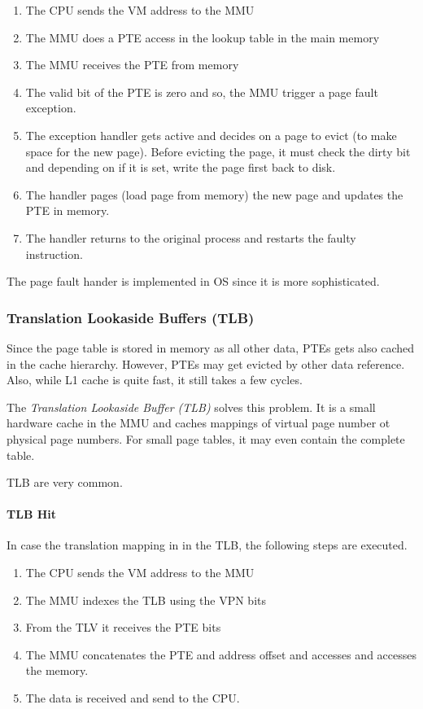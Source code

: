 \begin{enumerate}
    \item The CPU sends the VM address to the MMU
    \item The MMU does a PTE access in the lookup table in the main memory
    \item The MMU receives the PTE from memory
    \item The valid bit of the PTE is zero and so, the MMU trigger a page fault exception.
    \item The exception handler gets active and decides on a page to evict (to make space for the new page). Before evicting the page, it must check the dirty bit and depending on if it is set, write the page first back to disk.
    \item The handler pages (load page from memory) the new page and updates the PTE in memory.
    \item The handler returns to the original process and restarts the faulty instruction.
\end{enumerate}

The page fault hander is implemented in OS since it is more sophisticated.

\subsubsection{Translation Lookaside Buffers (TLB)}
Since the page table is stored in memory as all other data, PTEs gets also cached in the cache hierarchy. However, PTEs may get evicted by other data reference. Also, while L1 cache is quite fast, it still takes a few cycles. 

The \textit{Translation Lookaside Buffer (TLB)} solves this problem. It is a small hardware cache in the MMU and caches mappings of virtual page number ot physical page numbers. For small page tables, it may even contain the complete table.

TLB are very common.

\paragraph{TLB Hit}
In case the translation mapping in in the TLB, the following steps are executed.

\begin{enumerate}
    \item The CPU sends the VM address to the MMU
    \item The MMU indexes the TLB using the VPN bits
    \item From the TLV it receives the PTE bits
    \item The MMU concatenates the PTE and address offset and accesses and accesses the memory.
    \item The data is received and send to the CPU.
\end{enumerate}

